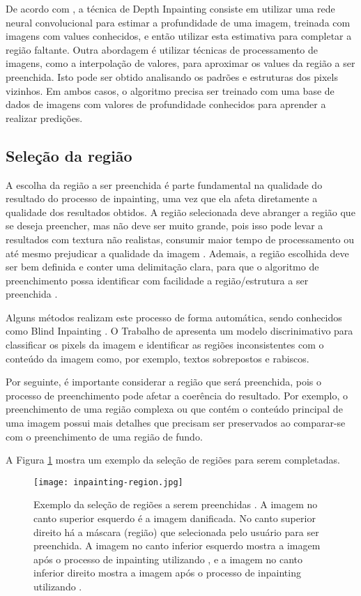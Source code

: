De acordo com \cite{shish20203dphoto}, a técnica de Depth Inpainting consiste em utilizar uma rede neural convolucional para estimar a profundidade de uma imagem, treinada com imagens com values conhecidos, e então utilizar esta estimativa para completar a região faltante.
Outra abordagem é utilizar técnicas de processamento de imagens, como a interpolação de valores, para aproximar os values da região a ser preenchida. Isto pode ser obtido analisando os padrões e estruturas dos pixels vizinhos. Em ambos casos, o algoritmo precisa ser treinado com uma base de dados de imagens com valores de profundidade conhecidos para aprender a realizar predições.

\subsection{Seleção da região} 
A escolha da região a ser preenchida é parte fundamental na qualidade do resultado do processo de inpainting, uma vez que ela afeta diretamente a qualidade dos resultados obtidos. A região selecionada deve abranger a região que se deseja preencher, mas não deve ser muito grande, pois isso pode levar a resultados com textura não realistas, consumir maior tempo de processamento ou até mesmo prejudicar a qualidade da imagem \cite{wang2020vcnet}.
Ademais, a região escolhida deve ser bem definida e conter uma delimitação clara, para que o algoritmo de preenchimento possa identificar com facilidade a região/estrutura a ser preenchida \cite{huang2014image}.

Alguns métodos realizam este processo de forma automática, sendo conhecidos como Blind Inpainting \cite{wang2020vcnet}. O Trabalho de \cite{wang2020vcnet} apresenta um modelo discrinimativo para classificar os pixels da imagem e identificar as regiões inconsistentes com o conteúdo da imagem como, por exemplo, textos sobrepostos e rabiscos.

Por seguinte, é importante considerar a região que será preenchida, pois o processo de preenchimento pode afetar a coerência do resultado. Por exemplo, o preenchimento de uma região complexa ou que contém o conteúdo principal de uma imagem possui mais detalhes que precisam ser preservados ao comparar-se com o preenchimento de uma região de fundo.

A Figura \ref{fig:inpainting-region} mostra um exemplo da seleção de regiões para serem completadas.
\begin{figure}[ht]
\centering
\texttt{[image: inpainting-region.jpg]}
\caption{Exemplo da seleção de regiões a serem preenchidas \cite{OpenCVmessi}. A imagem no canto superior esquerdo é a imagem danificada. No canto superior direito há a máscara (região) que selecionada pelo usuário para ser preenchida. A imagem no canto inferior esquerdo mostra a imagem após o processo de inpainting utilizando \cite{Bertalmio2001navier}, e a imagem no canto inferior direito mostra a imagem após o processo de inpainting utilizando \cite{Telea2004}.}
\label{fig:inpainting-region}
\end{figure}


